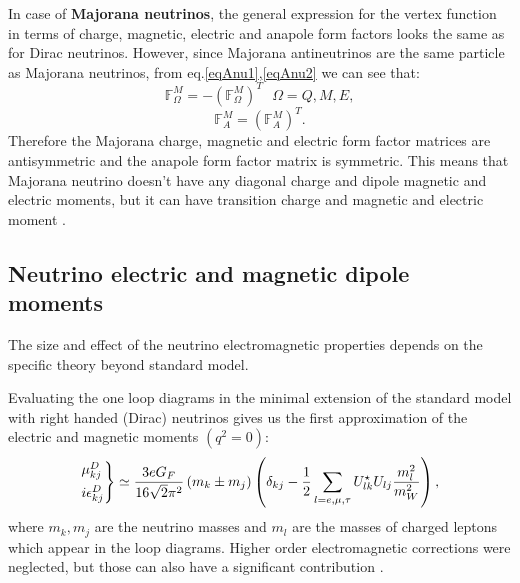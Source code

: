 In case of \textbf{Majorana neutrinos}, the general expression for the vertex function in terms of charge, magnetic, electric and anapole form factors looks the same as for Dirac neutrinos.
 However, since Majorana antineutrinos are the same particle as Majorana neutrinos, from eq.\ref{eqAnu1},\ref{eqAnu2} we can see that:
\begin{equation}\label{eqAntisymmetryCondition}
\mathbb{F}^M_{\Omega}=-\left(\mathbb{F}^M_{\Omega}\right)^T \ \ \ \Omega=Q,M,E,
\end{equation}
\begin{equation}
\mathbb{F}^M_{A}=\left(\mathbb{F}^M_A\right)^T.
\end{equation}
Therefore the Majorana charge, magnetic and electric form factor matrices are antisymmetric and the anapole form factor matrix is symmetric. This means that Majorana neutrino doesn't have any diagonal charge and dipole magnetic and electric moments, but it can have transition  charge and magnetic and electric moment \cite{nuElmagInt2015.pdf}.
\fi

\subsection{Neutrino electric and magnetic dipole moments}

The size and effect of the neutrino electromagnetic properties depends on the specific theory beyond standard model.

Evaluating the one loop diagrams in the minimal extension of the standard model  with right handed (Dirac) neutrinos gives us the first approximation of the electric and magnetic moments $\left(q^2=0\right)$:
\begin{equation}
\begin{rcases}
\mu^D_{kj}\\
i\epsilon^D_{kj}
\end{rcases}
\simeq\frac{3eG_F}{16\sqrt{2}\pi^2}\left(m_k\pm m_j\right)\left(\delta_{kj}-\frac{1}{2}\sum_{l=e,\mu ,\tau}U^{\star}_{lk}U_{lj}\frac{m_l^2}{m_W^2}\right),
\end{equation}
where $m_k,m_j$ are the neutrino masses and $m_l$ are the masses of charged leptons which appear in the loop diagrams. Higher order electromagnetic corrections were neglected, but those can also have a significant contribution \cite{nuElmagInt2015.pdf}.

